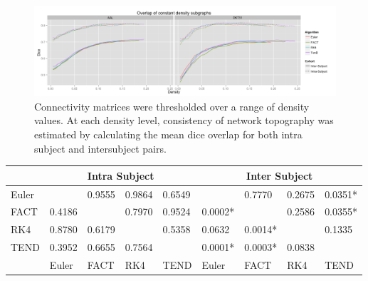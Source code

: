 \documentclass{frontiersSCNS} %
\begin{document}
\begin{figure}
\begin{center}
\includegraphics[width=0.5\linewidth]{figures/dice_overlap_plot.png} 
\caption{Connectivity matrices were thresholded over a range of density values. At each density level, consistency of network topography was estimated by calculating the mean dice overlap for both intra subject and intersubject pairs.}
\label{fig:dice}
\end{center}
\end{figure}


\begin{table}[!t]
{
\begin{tabular}{l | llll | llll }
\midrule
 & \multicolumn{4}{c}{Intra Subject}  & \multicolumn{4}{c}{Inter Subject} \\ 
\midrule
Euler  &            & 0.9555  & 0.9864    & 0.6549   &              & 0.7770  & 0.2675 & 0.0351*  \\
FACT & 0.4186 &              & 0.7970  & 0.9524     & 0.0002*  &             & 0.2586 & 0.0355* \\
RK4   & 0.8780 & 0.6179   &               & 0.5358   & 0.0632   & 0.0014* &            & 0.1335   \\
TEND & 0.3952 & 0.6655  & 0.7564    &            &    0.0001*  & 0.0003* & 0.0838 &               \\             
\midrule
         & Euler    & FACT     & RK4        & TEND      & Euler     & FACT     & RK4     & TEND       \\
\midrule
\end{tabular}}{}
\end{table}
\end{document}

